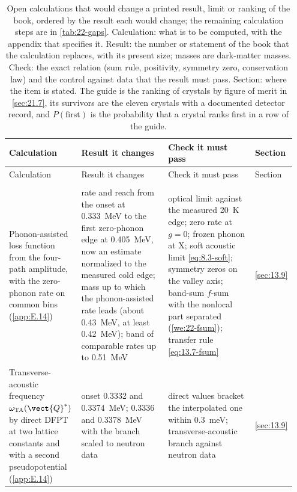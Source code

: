 {\scriptsize\setlength{\tabcolsep}{3pt}\setlength{\LTcapwidth}{\linewidth}
\begin{longtable}{@{}>{\raggedright\arraybackslash}p{0.25\linewidth}>{\raggedright\arraybackslash}p{0.305\linewidth}>{\raggedright\arraybackslash}p{0.305\linewidth}>{\raggedright\arraybackslash}p{0.09\linewidth}@{}}
  \caption{Open calculations that would change a printed result, limit or ranking of the book, ordered by the result each would change; the remaining calculation steps are in \cref{tab:22-gaps}. Calculation: what is to be computed, with the appendix that specifies it. Result: the number or statement of the book that the calculation replaces, with its present size; masses are dark-matter masses. Check: the exact relation (sum rule, positivity, symmetry zero, conservation law) and the control against data that the result must pass. Section: where the item is stated. The guide is the ranking of crystals by figure of merit in \cref{sec:21.7}, its survivors are the eleven crystals with a documented detector record, and $P(\mathrm{first})$ is the probability that a crystal ranks first in a row of the guide.}
  \label{tab:22-calc}\\
  \toprule
  Calculation & Result it changes & Check it must pass & Section \\
  \midrule
  \endfirsthead
  \toprule
  Calculation & Result it changes & Check it must pass & Section \\
  \midrule
  \endhead
  \bottomrule
  \endfoot
  \multicolumn{4}{@{}l}{\emph{Silicon electron recoil}} \\
  Phonon-assisted loss function from the four-path amplitude, with the zero-phonon rate on common bins (\cref{app:E.14}) & rate and reach from the onset at \SI{0.333}{MeV} to the first zero-phonon edge at \SI{0.405}{MeV}, now an estimate normalized to the measured cold edge; mass up to which the phonon-assisted rate leads (about \SI{0.43}{MeV}, at least \SI{0.42}{MeV}); band of comparable rates up to \SI{0.51}{MeV} & optical limit against the measured \SI{20}{K} edge; zero rate at $g = 0$; frozen phonon at X; soft acoustic limit \cref{eq:8.3-soft}; symmetry zeros on the valley axis; band-sum $f$-sum with the nonlocal part separated (\cref{we:22-fsum}); transfer rule \cref{eq:13.7-fsum} & \cref{sec:13.9} \\
  Transverse-acoustic frequency $\omega_{\mathrm{TA}}(\vect{Q}^*)$ by direct DFPT at two lattice constants and with a second pseudopotential (\cref{app:E.14}) & onset 0.3332 and \SI{0.3374}{MeV}; 0.3336 and \SI{0.3378}{MeV} with the branch scaled to neutron data & direct values bracket the interpolated one within \SI{0.3}{meV}; transverse-acoustic branch against neutron data & \cref{sec:13.9} \\

\end{longtable}}
